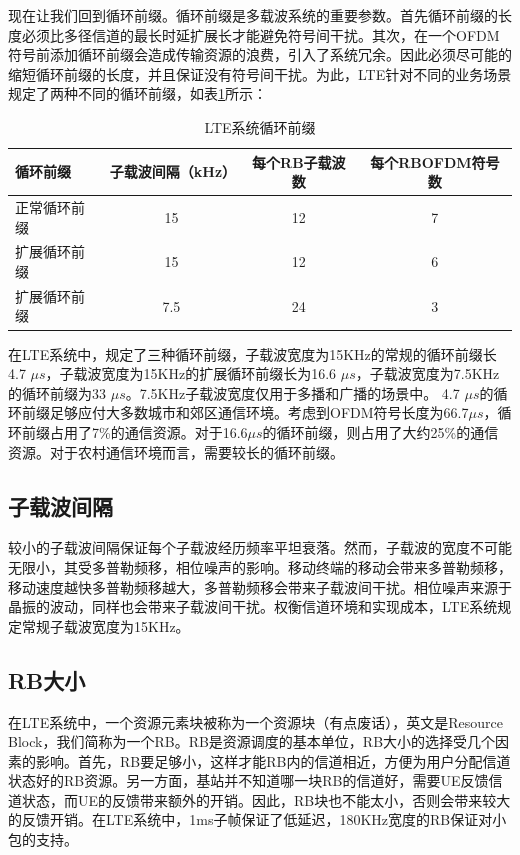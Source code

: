 \documentclass[10pt,a4paper,UTF8]{article}
\begin{document}
现在让我们回到循环前缀。循环前缀是多载波系统的重要参数。首先循环前缀的长度必须比多径信道的最长时延扩展长才能避免符号间干扰。其次，在一个OFDM符号前添加循环前缀会造成传输资源的浪费，引入了系统冗余。因此必须尽可能的缩短循环前缀的长度，并且保证没有符号间干扰。为此，LTE针对不同的业务场景规定了两种不同的循环前缀，如表\ref{tab:orgtable1}所示：
\begin{table}[htb]
\caption{\label{tab:orgtable1}
LTE系统循环前缀}
\centering
\begin{tabular}{lccc}
\hline
循环前缀 & 子载波间隔（kHz） & 每个RB子载波数 & 每个RBOFDM符号数\\
\hline
\hline
正常循环前缀 & 15 & 12 & 7\\
\hline
扩展循环前缀 & 15 & 12 & 6\\
\hline
扩展循环前缀 & 7.5 & 24 & 3\\
\hline
\end{tabular}
\end{table}
在LTE系统中，规定了三种循环前缀，子载波宽度为15KHz的常规的循环前缀长4.7 \(\mu s\)，子载波宽度为15KHz的扩展循环前缀长为16.6 \(\mu s\)，子载波宽度为7.5KHz的循环前缀为33 \(\mu s\)。7.5KHz子载波宽度仅用于多播和广播的场景中。 4.7 \(\mu s\)的循环前缀足够应付大多数城市和郊区通信环境。考虑到OFDM符号长度为66.7\(\mu s\)，循环前缀占用了7\%的通信资源。对于16.6\(\mu s\)的循环前缀，则占用了大约25\%的通信资源。对于农村通信环境而言，需要较长的循环前缀。
\subsection{子载波间隔}
\label{sec:orgheadline9}


较小的子载波间隔保证每个子载波经历频率平坦衰落。然而，子载波的宽度不可能无限小，其受多普勒频移，相位噪声的影响。移动终端的移动会带来多普勒频移，移动速度越快多普勒频移越大，多普勒频移会带来子载波间干扰。相位噪声来源于晶振的波动，同样也会带来子载波间干扰。权衡信道环境和实现成本，LTE系统规定常规子载波宽度为15KHz。
\subsection{RB大小}
\label{sec:orgheadline10}


在LTE系统中，一个资源元素块被称为一个资源块（有点废话），英文是Resource Block，我们简称为一个RB。RB是资源调度的基本单位，RB大小的选择受几个因素的影响。首先，RB要足够小，这样才能RB内的信道相近，方便为用户分配信道状态好的RB资源。另一方面，基站并不知道哪一块RB的信道好，需要UE反馈信道状态，而UE的反馈带来额外的开销。因此，RB块也不能太小，否则会带来较大的反馈开销。在LTE系统中，1ms子帧保证了低延迟，180KHz宽度的RB保证对小包的支持。
\end{document}
